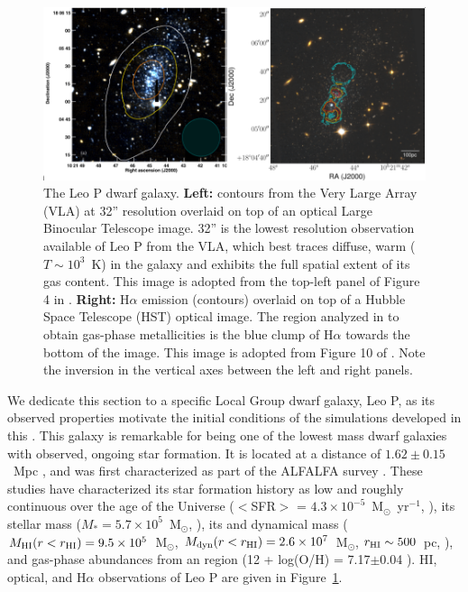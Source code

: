 \begin{figure}
 \centering
 \includegraphics[width=0.975\linewidth]{figures/intro/Leo_P}
 \caption{The Leo P dwarf galaxy. \textbf{Left:} \hi contours from the Very Large Array (VLA) at 32'' resolution overlaid on top of an optical Large Binocular Telescope image. 32'' is the lowest resolution \hi observation available of Leo P from the VLA, which best traces diffuse, warm ($T \sim 10^3$~K) \hi in the galaxy and exhibits the full spatial extent of its gas content. This image is adopted from the top-left panel of Figure 4 in \cite{Bernstein-Cooper2014}. \textbf{Right:} H$\alpha$ emission (contours) overlaid on top of a Hubble Space Telescope (HST) optical image. The \hii region analyzed in \cite{McQuinn2015} to obtain gas-phase metallicities is the blue clump of H$\alpha$ towards the bottom of the image. This image is adopted from Figure 10 of \cite{Evans2019}. Note the inversion in the vertical axes between the left and right panels.}
 \label{intro:fig:Leo P}
\end{figure}

We dedicate this section to a specific Local Group dwarf galaxy, Leo P, as its observed properties motivate the initial conditions of the simulations developed in this \dissertation. This galaxy is remarkable for being one of the lowest mass dwarf galaxies with observed, ongoing star formation. It is located at a distance of $1.62\pm 0.15$~Mpc \citep{McQuinn2015a}, and was first characterized as part of the ALFALFA survey \citep{Giovanelli2013,Rhode2013,Skillman2013,McQuinn2013,Bernstein-Cooper2014}. These studies have characterized its star formation history as low and roughly continuous over the age of the Universe ($<$SFR$>$ = $4.3\times 10^{-5}$~M$_{\odot}$~yr$^{-1}$, \cite{McQuinn2015a}), its stellar mass ($M_{*} = 5.7 \times 10^{5}$~M$_{\odot}$, \cite{McQuinn2013}), its \hi and dynamical mass ($M_{\rm HI}(r<r_{\rm HI}) = 9.5\times 10^{5}$~M$_{\odot}$, $M_{\rm dyn}(r<r_{\rm HI}) = 2.6 \times 10^{7}$~M$_{\odot}$, $r_{\rm HI} \sim 500$~pc, \cite{Bernstein-Cooper2014}), and gas-phase abundances from an \hii region (12 + log(O/H) = 7.17$\pm$0.04 \cite{Skillman2013}). HI, optical, and H$\alpha$ observations of Leo P are given in Figure~\ref{intro:fig:Leo P}.

